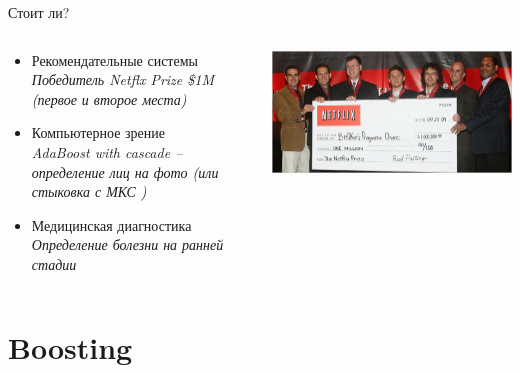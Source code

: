 \documentclass[10pt,a4paper]{beamer}
\begin{document}
\begin{frame}{Стоит ли?}



\begin{columns}[C]
    \begin{column}{.5\textwidth} 
	\begin{itemize}
	\item Рекомендательные системы \\ 
	{\it Победитель Netflx Prize \$1M (первое и второе места)}
	\item Компьютерное зрение \\ 
	{\it AdaBoost with cascade -- определение лиц на фото (или стыковка с МКС \blacksmiley{})}
	\item Медицинская диагностика \\
	{\it Определение болезни на ранней стадии}
	\end{itemize}    
    \end{column}
    \begin{column}{.5\textwidth} 
    \vspace{0em}
    \includegraphics[scale=0.33]{images/netflix.jpg}    
    \end{column}
\end{columns}

\end{frame}


\section{Boosting}

\end{document}

